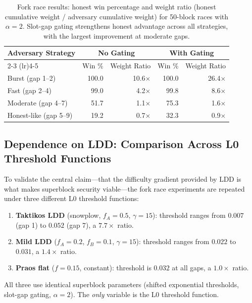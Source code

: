 \documentclass[11pt]{article}
\begin{document}
\begin{table}[t]
\centering
\begin{tabular}{lrrrr}
\toprule
Adversary Strategy & \multicolumn{2}{c}{No Gating} & \multicolumn{2}{c}{With Gating} \\
\cmidrule(lr){2-3} \cmidrule(lr){4-5}
 & Win \% & Weight Ratio & Win \% & Weight Ratio \\
\midrule
Burst (gap 1--2) & 100.0 & 10.6$\times$ & 100.0 & 26.4$\times$ \\
Fast (gap 2--4) & 99.0 & 4.2$\times$ & 99.8 & 8.6$\times$ \\
Moderate (gap 4--7) & 51.7 & 1.1$\times$ & 75.3 & 1.6$\times$ \\
Honest-like (gap 5--9) & 19.2 & 0.7$\times$ & 32.3 & 0.9$\times$ \\
\bottomrule
\end{tabular}
\caption{Fork race results: honest win percentage and weight ratio (honest cumulative weight / adversary cumulative weight) for 50-block races with $\alpha = 2$. Slot-gap gating strengthens honest advantage across all strategies, with the largest improvement at moderate gaps.}
\label{tab:results}
\end{table}

\subsection{Dependence on LDD: Comparison Across L0 Threshold Functions}
\label{sec:l0comparison}

To validate the central claim---that the difficulty gradient provided by LDD is what makes superblock security viable---the fork race experiments are repeated under three different L0 threshold functions:

\begin{enumerate}
    \item \textbf{Taktikos LDD} (snowplow, $f_A = 0.5$, $\gamma = 15$): threshold ranges from $0.007$ (gap 1) to $0.052$ (gap 7), a $7.7\times$ ratio.
    \item \textbf{Mild LDD} ($f_A = 0.2$, $f_B = 0.1$, $\gamma = 15$): threshold ranges from $0.022$ to $0.031$, a $1.4\times$ ratio.
    \item \textbf{Praos flat} ($f = 0.15$, constant): threshold is $0.032$ at all gaps, a $1.0\times$ ratio.
\end{enumerate}

All three use identical superblock parameters (shifted exponential thresholds, slot-gap gating, $\alpha = 2$). The \emph{only} variable is the L0 threshold function.
\end{document}
